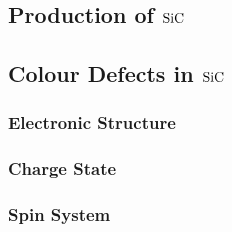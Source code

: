 \cite{Castelletto2020-ie}


\subsection{Production of $\ce{SiC}$}
\cite{Fuchs2015}


\cite{Ohshima2018}

\cite{Mu2020}


\cite{Wang2019}


\cite{Sardi2020}

\subsection{Colour Defects in $\ce{SiC}$}
\subsubsection{Electronic Structure}
\subsubsection{Charge State}
\subsubsection{Spin System}


